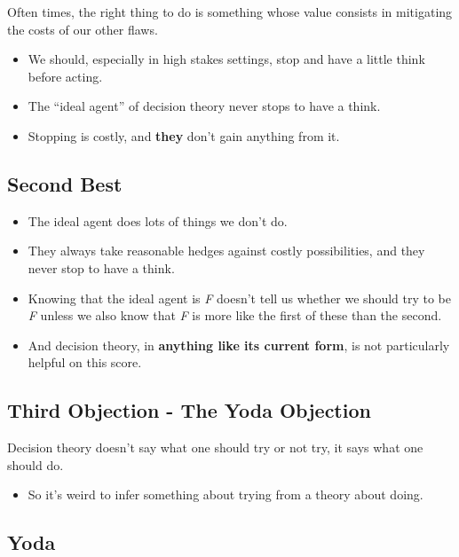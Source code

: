 \documentclass[
  11pt,
  letterpaper,
  DIV=11,
  numbers=noendperiod,
  oneside]{scrartcl}
\providecommand{\tightlist}{%
  \setlength{\itemsep}{0pt}\setlength{\parskip}{0pt}}\usepackage{longtable,booktabs,array}
\begin{document}
Often times, the right thing to do is something whose value consists in
mitigating the costs of our other flaws.

\begin{itemize}
\tightlist
\item
  We should, especially in high stakes settings, stop and have a little
  think before acting.
\item
  The ``ideal agent'' of decision theory never stops to have a think.
\item
  Stopping is costly, and \textbf{they} don't gain anything from it.
\end{itemize}

\subsection{Second Best}\label{second-best-1}

\begin{itemize}
\tightlist
\item
  The ideal agent does lots of things we don't do.
\item
  They always take reasonable hedges against costly possibilities, and
  they never stop to have a think.
\item
  Knowing that the ideal agent is \emph{F} doesn't tell us whether we
  should try to be \emph{F} unless we also know that \emph{F} is more
  like the first of these than the second.
\item
  And decision theory, in \textbf{anything like its current form}, is
  not particularly helpful on this score.
\end{itemize}

\subsection{Third Objection - The Yoda
Objection}\label{third-objection---the-yoda-objection}

Decision theory doesn't say what one should try or not try, it says what
one should do.

\begin{itemize}
\tightlist
\item
  So it's weird to infer something about trying from a theory about
  doing.
\end{itemize}

\subsection{Yoda}\label{yoda}
\end{document}
